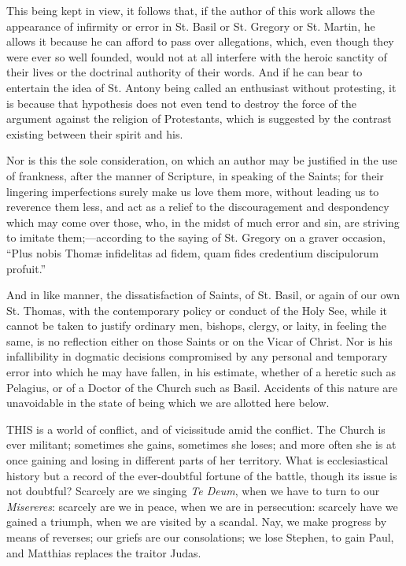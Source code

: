 This being kept in view, it follows that, if the author of this
work allows the appearance of infirmity or error in St. Basil or St.
Gregory or St. Martin, he allows it because he can afford to pass over
allegations, which, even though they were ever so well founded, would
not at all interfere with the heroic sanctity of their lives or the
doctrinal authority of their words. And if he can bear to entertain
the idea of St. Antony being called an enthusiast without protesting,
it is because that hypothesis does not even tend to destroy the force
of the argument against the religion of Protestants, which is
suggested by the contrast existing between their spirit and his.

Nor is this the sole consideration, on which an author may be
justified in the use of frankness, after the manner of
Scripture, in speaking of the Saints; for their lingering
imperfections surely make us love them more, without leading us to
reverence them less, and act as a relief to the discouragement and
despondency which may come over those, who, in the midst of much error
and sin, are striving to imitate them;—according to the saying of
St. Gregory on a graver occasion, ``Plus nobis Thomæ infidelitas
ad fidem, quam fides credentium discipulorum profuit.''

And in like manner, the dissatisfaction of Saints, of St. Basil, or
again of our own St. Thomas, with the contemporary policy or conduct
of the Holy See, while it cannot be taken to justify ordinary men,
bishops, clergy, or laity, in feeling the same, is no reflection
either on those Saints or on the Vicar of Christ. Nor is his
infallibility in dogmatic decisions compromised by any personal and
temporary error into which he may have fallen, in his estimate,
whether of a heretic such as Pelagius, or of a Doctor of the Church
such as Basil. Accidents of this nature are unavoidable in the state
of being which we are allotted here below.


THIS is a world of conflict, and of
vicissitude amid the conflict. The Church is ever militant; sometimes
she gains, sometimes she loses; and more often she is at once gaining
and losing in different parts of her territory. What is ecclesiastical
history but a record of the ever-doubtful fortune of the battle,
though its issue is not doubtful? Scarcely are we singing \emph{Te Deum},
when we have to turn to our \emph{Misereres}: scarcely are we in
peace, when we are in persecution: scarcely have we gained a triumph,
when we are visited by a scandal. Nay, we make progress by means of
reverses; our griefs are our consolations; we lose Stephen, to gain
Paul, and Matthias replaces the traitor Judas.


